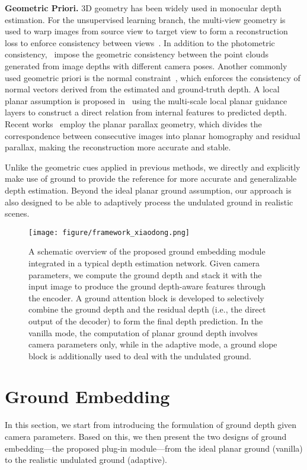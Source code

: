 \documentclass[10pt,twocolumn,letterpaper]{article}
\begin{document}
\noindent\textbf{Geometric Priori.} 
3D geometry has been widely used in monocular depth estimation. For the unsupervised learning branch, the multi-view geometry is used to warp images from source view to target view to form a reconstruction loss to enforce consistency between views~\cite{godard2019digging, zhou2017unsupervised}. In addition to the photometric consistency,~\cite{hirose2021plg,mahjourian2018unsupervised} impose the geometric consistency between the point clouds generated from image depths with different camera poses. Another commonly used geometric priori is the normal constraint~\cite{long2021adaptive,qi2018geonet}, which enforces the consistency of normal vectors derived from the estimated and ground-truth depth. A local planar assumption is proposed in~\cite{lee2019big} using the multi-scale local planar guidance layers to construct a direct relation from internal features to predicted depth. Recent works~\cite{xing2022joint,yuan2021monocular} employ the planar parallax geometry, which divides the correspondence between consecutive images into planar homography and residual parallax, making the reconstruction more accurate and stable. 

Unlike the geometric cues applied in previous methods, we directly and explicitly make use of ground to provide the reference for more accurate and generalizable depth estimation. Beyond the ideal planar ground assumption, our approach is also designed to be able to adaptively process the undulated ground in realistic scenes. 

\begin{figure*}[t]
\centering
\texttt{[image: figure/framework\_xiaodong.png]}
 \caption{A schematic overview of the proposed ground embedding module integrated in a typical depth estimation network. Given camera parameters, we compute the ground depth and stack it with the input image to produce the ground depth-aware features through the encoder. A ground attention block is developed to selectively combine the ground depth and the residual depth (i.e., the direct output of the decoder) to form the final depth prediction. In the vanilla mode, the computation of planar ground depth involves camera parameters only, while in the adaptive mode, a ground slope block is additionally used to deal with the undulated ground.
 }
\label{fig:workflow}
\end{figure*}

\section{Ground Embedding}
\label{section:Method}
\label{section:pe_module}
In this section, we start from introducing the formulation of ground depth given camera parameters. Based on this, we then present the two designs of ground embedding---the proposed plug-in module---from the ideal planar ground (vanilla) to the realistic undulated ground (adaptive).    
\end{document}
